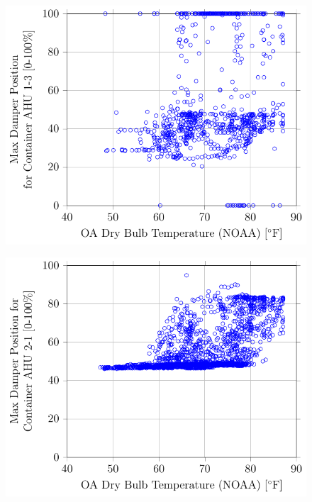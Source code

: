 \begin{figure}
\centering
\includegraphics{Plots/MaximumDamperPosition-1-3.pdf}
\caption{}
\label{fig:MaxDamperPositionforContainerAHU13vsOADryBulbTemperatureNOAA}
\end{figure}


\begin{figure}
\centering
\includegraphics{Plots/MaximumDamperPosition-2-1.pdf}
\caption{}
\label{fig:MaxDamperPositionforContainerAHU21vsOADryBulbTemperatureNOAA}
\end{figure}

